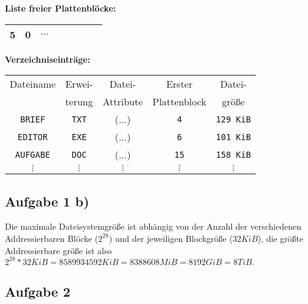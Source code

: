 \documentclass{scrartcl}
\begin{document}
%
\begin{minipage}[t]{0.6\columnwidth}%
  \vspace{1cm}
  \textbf{Liste freier Plattenbl\"{o}cke:}

  \begin{tabular}{|c|c|c|c|c|c|c|c}
    \hline
    5 & 0 & $\dots$\\
    \hline
  \end{tabular}

  \vspace{2cm}

  \textbf{Verzeichniseintr\"{a}ge:}

  \begin{tabular}{|c|c|c|c|c|}
    \hline
    Dateiname       & Erwei-       & Datei-    & Erster       & Datei-           \\
                    & terung       & Attribute & Plattenblock & gr\"{o}\ss{}e    \\\hline
    \texttt{BRIEF}  & \texttt{TXT} & ($\dots$) & \texttt{4}   & \texttt{129 KiB} \\
    \texttt{EDITOR} & \texttt{EXE} & ($\dots$) & \texttt{6}   & \texttt{101 KiB} \\
    \texttt{AUFGABE}& \texttt{DOC} & ($\dots$) & \texttt{15}  & \texttt{158 KiB} \\
    $\vdots$        & $\vdots$     & $\vdots$  & $\vdots$     & $\vdots$         \\
  \end{tabular}%
\end{minipage}


\subsection*{Aufgabe 1 b)}
Die maximale Dateisystemgröße ist abhängig von der Anzahl der verschiedenen Addressierbaren Blöcke
($2^{28}$) und der jeweiligen Blockgröße ($32KiB$), die größte Addressierbare größe ist also
$2^{28} * 32KiB = 8589934592KiB = 8388608MiB = 8192GiB = 8TiB.$


\subsection*{Aufgabe 2}
\end{document}
